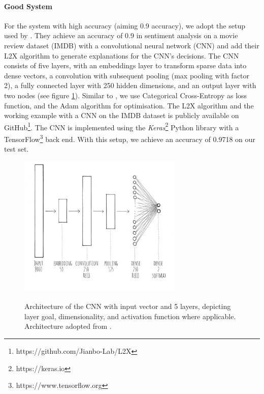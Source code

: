 \paragraph{Good System}
For the system with high accuracy (aiming 0.9 accuracy), we adopt the setup used by \cite{chen2018learning}. They achieve an accuracy of 0.9 in sentiment analysis on a movie review dataset (IMDB) with a convolutional neural network (CNN) and add their L2X algorithm to generate explanations for the CNN's decisions. The CNN consists of five layers, with an embeddings layer to transform sparse data into dense vectors, a convolution with subsequent pooling (max pooling with factor 2), a fully connected layer with 250 hidden dimensions, and an output layer with two nodes (see figure \ref{fig:impl_cnn}). Similar to \cite{chen2012detecting}, we use Categorical Cross-Entropy as loss function, and the Adam algorithm for optimisation. The L2X algorithm and the working example with a CNN on the IMDB dataset is publicly available on GitHub\footnote{https://github.com/Jianbo-Lab/L2X}. The CNN is implemented using the \textit{Keras}\footnote{https://keras.io} Python library with a TensorFlow\footnote{https://www.tensorflow.org} back end. With this setup, we achieve an accuracy of 0.9718 on our test set. 
\begin{figure} [!ht]
	\centering
	\includegraphics[width=0.7\textwidth]{img/impl_cnn.JPG}\\
	\caption{Architecture of the CNN with input vector and 5 layers, depicting layer goal, dimensionality, and activation function where applicable. Architecture adopted from \cite{chen2018learning}.}
	\label{fig:impl_cnn}
\end{figure}

